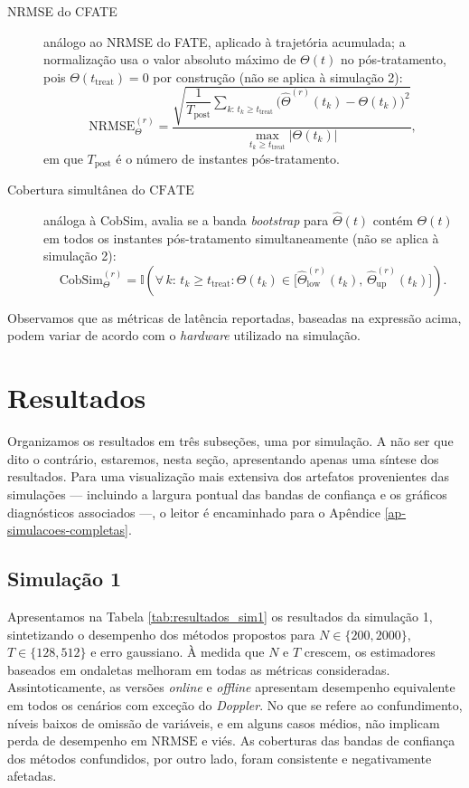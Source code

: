 \begin{description}
	\item[NRMSE do CFATE] análogo ao NRMSE do FATE, aplicado à trajetória acumulada; a normalização usa o valor absoluto máximo de \(\Theta(t)\) no pós-tratamento, pois \(\Theta(t_{\mathrm{treat}}) = 0\) por construção (não se aplica à simulação 2):
	\begin{equation*}
		\mathrm{NRMSE}_\Theta^{(r)} = \frac{\sqrt{\dfrac{1}{T_{\mathrm{post}}}\displaystyle\sum_{k:\, t_k \geq t_{\mathrm{treat}}} \bigl(\hat{\Theta}^{(r)}(t_k) - \Theta(t_k)\bigr)^2}}{\displaystyle\max_{t_k \geq t_{\mathrm{treat}}} |\Theta(t_k)|},
	\end{equation*}
	em que \(T_{\mathrm{post}}\) é o número de instantes pós-tratamento.
	\item[Cobertura simultânea do \(\mathrm{CFATE}\)] análoga à CobSim, avalia se a banda \emph{bootstrap} para \(\hat{\Theta}(t)\) contém \(\Theta(t)\) em todos os instantes pós-tratamento simultaneamente (não se aplica à simulação 2):
	\begin{equation*}
		\mathrm{CobSim}_\Theta^{(r)} = \mathbb{I}\!\left(\forall\, k:\, t_k \geq t_{\mathrm{treat}} : \Theta(t_k) \in \bigl[\hat{\Theta}_{\mathrm{low}}^{(r)}(t_k),\, \hat{\Theta}_{\mathrm{up}}^{(r)}(t_k)\bigr]\right).
	\end{equation*}
\end{description}

Observamos que as métricas de latência reportadas, baseadas na expressão acima, podem variar de acordo com o \emph{hardware} utilizado na simulação. 

\section{Resultados}
Organizamos os resultados em três subseções, uma por simulação.
A não ser que dito o contrário, estaremos, nesta seção, apresentando apenas uma síntese dos resultados. 
Para uma visualização mais extensiva dos artefatos provenientes das simulações --- incluindo a largura pontual das bandas de confiança e os gráficos diagnósticos associados ---, o leitor é encaminhado para o Apêndice \ref{ap-simulacoes-completas}.

\subsection{Simulação 1}
Apresentamos na Tabela \ref{tab:resultados_sim1} os resultados da simulação 1, sintetizando o desempenho dos métodos propostos para \(N \in \{200, 2000\}\), \(T \in \{128, 512\}\) e erro gaussiano.
À medida que \(N\) e \(T\) crescem, os estimadores baseados em ondaletas melhoram em todas as métricas consideradas. 
Assintoticamente, as versões \emph{online} e \emph{offline} apresentam desempenho equivalente em todos os cenários com exceção do \emph{Doppler}. 
No que se refere ao confundimento, níveis baixos de omissão de variáveis, e em alguns casos médios, não implicam perda de desempenho em \(\mathrm{NRMSE}\) e viés. 
As coberturas das bandas de confiança dos métodos confundidos, por outro lado, foram consistente e negativamente afetadas.

